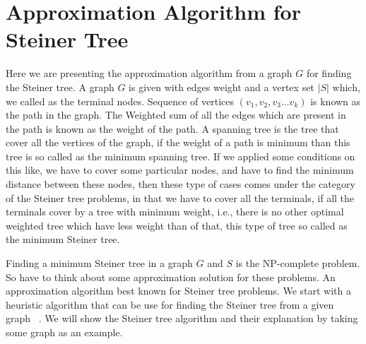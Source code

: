 \section{Approximation Algorithm for Steiner Tree}

Here we are presenting the approximation algorithm from a graph $G$ for finding the Steiner tree. A graph $G$ is given with edges weight and a vertex set $|S|$ which, we called as the terminal nodes. Sequence of vertices $(v_1,v_2,v_3 \dots v_k)$ is known as the path in the graph. The Weighted sum of all the edges which are present in the path is known as the weight of the path. A spanning tree is the tree that cover all the vertices of the graph, if the weight of a path is minimum than this tree is so called as the minimum spanning tree. If we applied some conditions on this like, we have to cover some particular nodes, and have to find the minimum distance between these nodes, then these type of cases comes under the category of the Steiner tree problems, in that we have to cover all the terminals, if all the terminals cover by a tree with minimum weight, i.e., there is no other optimal weighted tree which have less weight than of that, this type of tree so called as the minimum Steiner tree.

 Finding a minimum Steiner tree in a graph $G$ and $S$ is the NP-complete problem. So have to think about some approximation solution for these problems. An approximation algorithm best known for Steiner tree problems. We start with a heuristic algorithm that can be use for finding the Steiner tree from a given graph ~\cite{markowsky}. We will show the Steiner tree algorithm and their explanation by taking some graph as an example.

